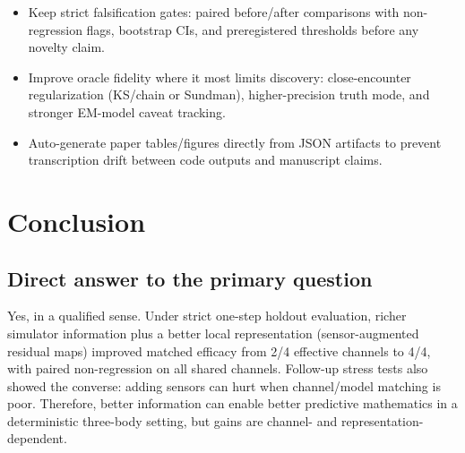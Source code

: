 \documentclass[11pt]{article}
\begin{document}
\begin{itemize}
\item Keep strict falsification gates: paired before/after comparisons with non-regression flags, bootstrap CIs, and preregistered thresholds before any novelty claim.
\item Improve oracle fidelity where it most limits discovery: close-encounter regularization (KS/chain or Sundman), higher-precision truth mode, and stronger EM-model caveat tracking.
\item Auto-generate paper tables/figures directly from JSON artifacts to prevent transcription drift between code outputs and manuscript claims.
\end{itemize}

\section{Conclusion}
\subsection*{Direct answer to the primary question}
Yes, in a qualified sense. Under strict one-step holdout evaluation, richer simulator information plus a better local representation (sensor-augmented residual maps) improved matched efficacy from 2/4 effective channels to 4/4, with paired non-regression on all shared channels. Follow-up stress tests also showed the converse: adding sensors can hurt when channel/model matching is poor. Therefore, better information can enable better predictive mathematics in a deterministic three-body setting, but gains are channel- and representation-dependent.
\end{document}

